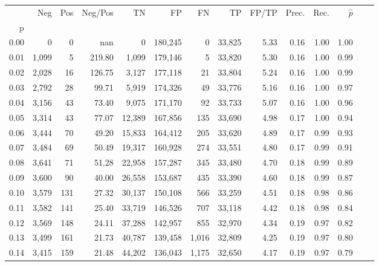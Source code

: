 \begin{tabular}{rrrrrrrrrrrrrr}
\toprule
{} &    Neg &  Pos & Neg/Pos &       TN &       FP &      FN &      TP & FP/TP & Prec. &  Rec. & $\hat{p}$ \\
p    &        &      &         &          &          &         &         &       &       &       &           \\
\midrule
0.00 &      0 &    0 &     nan &        0 &  180,245 &       0 &  33,825 &  5.33 &  0.16 &  1.00 &      1.00 \\
0.01 &  1,099 &    5 &  219.80 &    1,099 &  179,146 &       5 &  33,820 &  5.30 &  0.16 &  1.00 &      0.99 \\
0.02 &  2,028 &   16 &  126.75 &    3,127 &  177,118 &      21 &  33,804 &  5.24 &  0.16 &  1.00 &      0.99 \\
0.03 &  2,792 &   28 &   99.71 &    5,919 &  174,326 &      49 &  33,776 &  5.16 &  0.16 &  1.00 &      0.97 \\
0.04 &  3,156 &   43 &   73.40 &    9,075 &  171,170 &      92 &  33,733 &  5.07 &  0.16 &  1.00 &      0.96 \\
0.05 &  3,314 &   43 &   77.07 &   12,389 &  167,856 &     135 &  33,690 &  4.98 &  0.17 &  1.00 &      0.94 \\
0.06 &  3,444 &   70 &   49.20 &   15,833 &  164,412 &     205 &  33,620 &  4.89 &  0.17 &  0.99 &      0.93 \\
0.07 &  3,484 &   69 &   50.49 &   19,317 &  160,928 &     274 &  33,551 &  4.80 &  0.17 &  0.99 &      0.91 \\
0.08 &  3,641 &   71 &   51.28 &   22,958 &  157,287 &     345 &  33,480 &  4.70 &  0.18 &  0.99 &      0.89 \\
0.09 &  3,600 &   90 &   40.00 &   26,558 &  153,687 &     435 &  33,390 &  4.60 &  0.18 &  0.99 &      0.87 \\
0.10 &  3,579 &  131 &   27.32 &   30,137 &  150,108 &     566 &  33,259 &  4.51 &  0.18 &  0.98 &      0.86 \\
0.11 &  3,582 &  141 &   25.40 &   33,719 &  146,526 &     707 &  33,118 &  4.42 &  0.18 &  0.98 &      0.84 \\
0.12 &  3,569 &  148 &   24.11 &   37,288 &  142,957 &     855 &  32,970 &  4.34 &  0.19 &  0.97 &      0.82 \\
0.13 &  3,499 &  161 &   21.73 &   40,787 &  139,458 &   1,016 &  32,809 &  4.25 &  0.19 &  0.97 &      0.80 \\
0.14 &  3,415 &  159 &   21.48 &   44,202 &  136,043 &   1,175 &  32,650 &  4.17 &  0.19 &  0.97 &      0.79 \\

\end{tabular}
